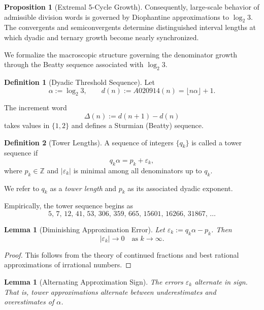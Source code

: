 \documentclass[12pt, oneside]{article}
\numberwithin{equation}{section}
\theoremstyle{definition}
\newtheorem{definition}{Definition}[section]
\newtheorem{proposition}{Proposition}[section]
\theoremstyle{plain}
\newtheorem{lemma}[theorem]{Lemma}
\theoremstyle{remark}
\begin{document}
\begin{proposition}[Extremal 5-Cycle Growth]
Consequently, large-scale behavior of admissible division words is governed
by Diophantine approximations to \(\log_2 3\). The convergents and
semiconvergents determine distinguished interval lengths at which dyadic
and ternary growth become nearly synchronized.

We formalize the macroscopic structure governing the denominator growth
through the Beatty sequence associated with $\log_2 3$.


\begin{definition}[Dyadic Threshold Sequence]
Let
\[
\alpha := \log_2 3,
\qquad
d(n) := A020914(n) = \lfloor n\alpha \rfloor + 1.
\]
\end{definition}

The increment word
\[
\Delta(n) := d(n+1)-d(n)
\]
takes values in $\{1,2\}$ and defines a Sturmian (Beatty) sequence.


\begin{definition}[Tower Lengths]
A sequence of integers $\{q_k\}$ is called a tower sequence if
\[
q_k \alpha = p_k + \varepsilon_k,
\]
where $p_k \in \mathbb{Z}$ and $|\varepsilon_k|$ is minimal among all
denominators up to $q_k$.

We refer to $q_k$ as a \emph{tower length} and $p_k$ as its associated
dyadic exponent.
\end{definition}

Empirically, the tower sequence begins as
\[
5,\,7,\,12,\,41,\,53,\,306,\,359,\,665,\,15601,\,16266,\,31867,\,\dots
\]


\begin{lemma}[Diminishing Approximation Error]
\label{lem:tower-error}
Let $\varepsilon_k := q_k \alpha - p_k$.
Then
\[
|\varepsilon_k| \to 0 \quad \text{as } k \to \infty.
\]
\end{lemma}

\begin{proof}
This follows from the theory of continued fractions and best rational
approximations of irrational numbers.
\end{proof}


\begin{lemma}[Alternating Approximation Sign]
\label{lem:alternating}
The errors $\varepsilon_k$ alternate in sign.  That is,
tower approximations alternate between underestimates and overestimates
of $\alpha$.
\end{lemma}


\end{proposition}
\end{document}
